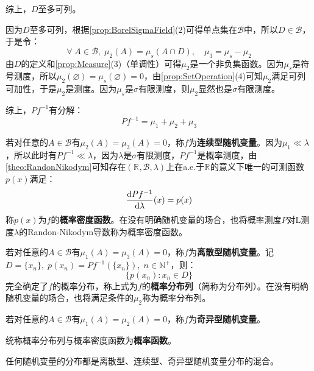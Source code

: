 综上，$D$至多可列。\par
因为$D$至多可列，根据\cref{prop:BorelSigmaField}(2)可得单点集在$\mathcal{B}$中，所以$D\in\mathcal{B}$，于是令：
\begin{equation*}
	\forall\;A\in\mathcal{B},\;\mu_2(A)=\mu_s(A\cap D),\quad\mu_3=\mu_s-\mu_2
\end{equation*}
由$D$的定义和\cref{prop:Measure}(3)（单调性）可得$\mu_2$是一个非负集函数。因为$\mu_s$是符号测度，所以$\mu_2(\varnothing)=\mu_s(\varnothing)=0$，由\cref{prop:SetOperation}(4)可知$\mu_2$满足可列可加性，于是$\mu_2$是测度。因为$\mu_s$是$\sigma$有限测度，则$\mu_2$显然也是$\sigma$有限测度。\par
综上，$Pf^{-1}$有分解：
\begin{equation*}
	Pf^{-1}=\mu_1+\mu_2+\mu_3
\end{equation*}\par
若对任意的$A\in\mathcal{B}$有$\mu_2(A)=\mu_3(A)=0$，称$f$为\textbf{连续型随机变量}。因为$\mu_1\ll\lambda$，所以此时有$Pf^{-1}\ll\lambda$，因为$\lambda$是$\sigma$有限测度，$Pf^{-1}$是概率测度，由\cref{theo:RandonNikodym}可知存在$(\mathbb{R}^{},\mathcal{B},\lambda)$上在a.e.于$\mathbb{R}^{}$的意义下唯一的可测函数$p(x)$满足：
\begin{equation*}
	\dfrac{\mathop{}\!\mathrm{d} Pf^{-1}}{\mathop{}\!\mathrm{d} \lambda}(x)=p(x)
\end{equation*}
称$p(x)$为$f$的\textbf{概率密度函数}。在没有明确随机变量的场合，也将概率测度$P$对L测度$\lambda$的Randon-Nikodym导数称为概率密度函数。\par
若对任意的$A\in\mathcal{B}$有$\mu_1(A)=\mu_3(A)=0$，称$f$为\textbf{离散型随机变量}。记$D=\{x_n\},\;p(x_n)=Pf^{-1}(\{x_n\}),\;n\in\mathbb{N}^+$，则：
\begin{equation*}
	\{p(x_n):x_n\in D\}
\end{equation*}
完全确定了$f$的概率分布，称上式为$f$的\textbf{概率分布列}（简称为分布列）。在没有明确随机变量的场合，也将满足条件的$\mu_2$称为概率分布列。\par
若对任意的$A\in\mathcal{B}$有$\mu_1(A)=\mu_2(A)=0$，称$f$为\textbf{奇异型随机变量}。\par
统称概率分布列与概率密度函数为\textbf{概率函数}。\par
\begin{theorem}
	任何随机变量的分布都是离散型、连续型、奇异型随机变量分布的混合。
\end{theorem}

